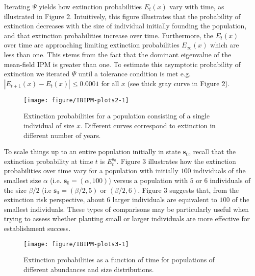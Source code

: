 \documentclass[12pt]{amsart}\usepackage[]{graphicx}\usepackage[]{color}
\makeatletter
\def\maxwidth{ %
  \ifdim\Gin@nat@width>\linewidth
    \linewidth
  \else
    \Gin@nat@width
  \fi
}
\newenvironment{knitrout}{}{} %
\def\s{\mathbf s}
\makeatother
\begin{document}
Iterating $\Psi$ yields how extinction probabilities $E_t(x)$ vary with time, as illustrated in Figure 2. Intuitively, this figure illustrates that the probability of extinction decreases with the size of individual initially founding the population, and that extinction probabilities increase over time. Furthermore, the $E_t(x)$ over time are approaching limiting extinction probabilities $E_{\infty}(x)$ which are less than one. This stems from the fact that the dominant eigenvalue of the mean-field IPM is greater than one. To estimate this asymptotic probability of extinction we  iterated $\Psi$ until a tolerance condition is met e.g. $|E_{t+1}(x)-E_t(x)|\le 0.0001$ for all $x$ (see thick gray curve in Figure 2).



\begin{knitrout}
\color{fgcolor}\begin{figure}
\texttt{[image: figure/IBIPM-plots2-1]} \caption[Extinction probabilities for a population consisting of a single individual of size ]{Extinction probabilities for a population consisting of a single individual of size $x$. Different curves correspond to extinction in different number of years.}\label{fig:IBIPM-plots2}
\end{figure}


\end{knitrout}

To scale things up to an entire population initially in state $\s_0$, recall that the extinction probability at time $t$ is $E_t^{\s_0}$. Figure 3 illustrates how the extinction probabilities over time vary for a population with initially $100$ individuals of the smallest size $\alpha$ (i.e. $\s_0=(\alpha,100)$) versus a population with $5$ or $6$ individuals of the  size $\beta/2$ (i.e $\s_0=(\beta/2,5)$ or $(\beta/2,6)$. Figure 3 suggests that, from the extinction risk perspective, about $6$ larger individuals are equivalent to $100$ of the smallest individuals. These types of comparisons may be particularly useful when trying to assess whether planting small or larger individuals are more effective for establishment success.

\begin{knitrout}
\color{fgcolor}\begin{figure}
\texttt{[image: figure/IBIPM-plots3-1]} \caption[Extinction probabilities as a function of time for populations of different abundances and size distributions]{Extinction probabilities as a function of time for populations of different abundances and size distributions.}\label{fig:IBIPM-plots3}
\end{figure}


\end{knitrout}
\end{document}
